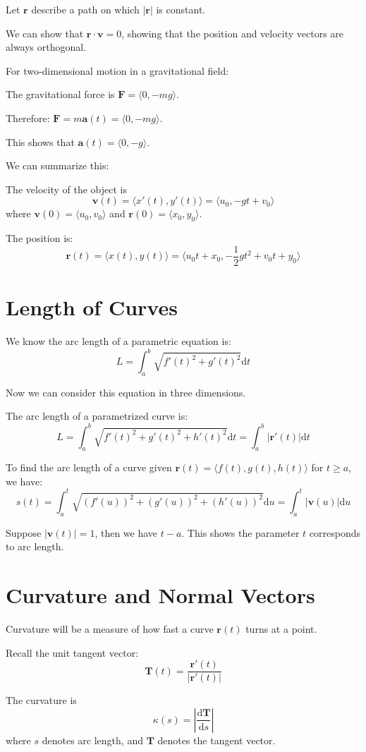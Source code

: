 \documentclass[../calc3.tex]{subfiles}
\begin{document}
Let $\textbf{r}$ describe a path on which $|\textbf{r}|$ is constant.

We can show that $\textbf{r}\cdot\textbf{v}=0$, showing that the position and velocity vectors are always orthogonal.

For two-dimensional motion in a gravitational field:

The gravitational force is $\textbf{F}=\langle 0, -mg\rangle$.

Therefore: $\textbf{F}=m\textbf{a}(t)=\langle 0,-mg\rangle$.

This shows that $\textbf{a}(t)=\langle 0,-g\rangle$.

We can summarize this:

The velocity of the object is 
\[\textbf{v}(t)=\langle x'(t),y'(t)\rangle =\langle u_0,-gt+v_0\rangle\]
where $\textbf{v}(0)=\langle u_0,v_0\rangle$ and $\textbf{r}(0)=\langle x_0,y_0\rangle$.

The position is:
\[\textbf{r}(t)=\langle x(t),y(t)\rangle=\langle u_0t+x_0,-\frac{1}{2}gt^2+v_0t+y_0\rangle\] 

\section{Length of Curves}
We know the arc length of a parametric equation is:
\[L=\int_a^b\sqrt{f'(t)^2+g'(t)^2}\mathrm{d}t\]

Now we can consider this equation in three dimensions.

The arc length of a parametrized curve is:
\[L=\int_a^b\sqrt{f'(t)^2+g'(t)^2+h'(t)^2}\mathrm{d}t=\int_a^b|\textbf{r}'(t)|\mathrm{d}t\] 

To find the arc length of a curve given $\textbf{r}(t)=\langle f(t),g(t),h(t)\rangle$ for $t\geq a$, we have:
\[s(t)=\int_a^t\sqrt{(f'(u))^2+(g'(u))^2+(h'(u))^2}\mathrm{d}u=\int_a^t |\textbf{v}(u)|\mathrm{d}u\] 

Suppose $|\textbf{v}(t)| = 1$, then we have $t-a$. This shows the parameter $t$ corresponds to arc length.

\section{Curvature and Normal Vectors}
Curvature will be a measure of how fast a curve $\textbf{r}(t)$ turns at a point.

Recall the unit tangent vector:
\[\textbf{T}(t)=\frac{\textbf{r}'(t)}{|\textbf{r}'(t)|}\]    

The curvature is 
\[\kappa(s) = \left|\frac{\mathrm{d}\textbf{T}}{\mathrm{d}s}\right|\] 
where $s$ denotes arc length, and $\textbf{T}$ denotes the tangent vector.
\end{document}

